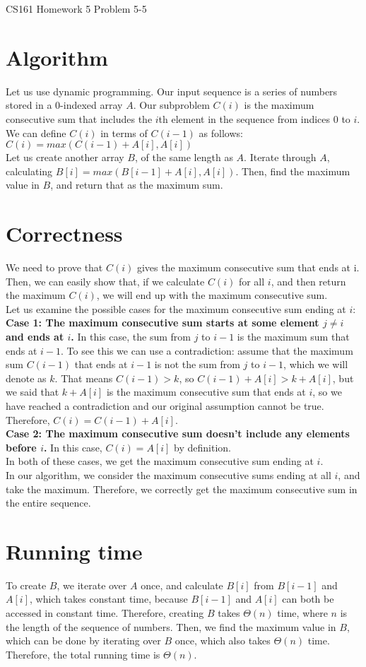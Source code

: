 \documentclass[12pt]{article}
\begin{document}
\begin{center}
{\Large CS161 Homework 5 Problem 5-5}

\end{center}
\section*{Algorithm}
Let us use dynamic programming. Our input sequence is a series of numbers stored in a 0-indexed array $A$. Our subproblem $C(i)$ is the maximum consecutive sum that includes the $i$th element in the sequence from indices $0$ to $i$. We can define $C(i)$ in terms of $C(i-1)$ as follows:\\
$C(i) = max(C(i-1) + A[i], A[i])$\\
Let us create another array $B$, of the same length as $A$. Iterate through $A$, calculating $B[i] = max(B[i-1] + A[i], A[i])$. Then, find the maximum value in $B$, and return that as the maximum sum. 

\section*{Correctness}
We need to prove that $C(i)$ gives the maximum consecutive sum that ends at i. Then, we can easily show that, if we calculate $C(i)$ for all $i$, and then return the maximum $C(i)$, we will end up with the maximum consecutive sum.\\
Let us examine the possible cases for the maximum consecutive sum ending at $i$:\\
\textbf{Case 1: The maximum consecutive sum starts at some element $j \ne i$ and ends at $i$.} In this case, the sum from $j$ to $i-1$ is the maximum sum that ends at $i-1$. To see this we can use a contradiction: assume that the maximum sum $C(i-1)$ that ends at $i-1$ is not the sum from $j$ to $i-1$, which we will denote as $k$. That means $C(i-1) > k$, so $C(i-1) + A[i] > k + A[i]$, but we said that $k + A[i]$ is the maximum consecutive sum that ends at $i$, so we have reached a contradiction and our original assumption cannot be true. Therefore, $C(i) = C(i-1) + A[i]$.\\
\textbf{Case 2: The maximum consecutive sum doesn't include any elements before $i$.} In this case, $C(i) = A[i]$ by definition.\\
In both of these cases, we get the maximum consecutive sum ending at $i$.\\
In our algorithm, we consider the maximum consecutive sums ending at all $i$, and take the maximum. Therefore, we correctly get the maximum consecutive sum in the entire sequence.

\section*{Running time}
To create $B$, we iterate over $A$ once, and calculate $B[i]$ from $B[i-1]$ and $A[i]$, which takes constant time, because $B[i-1]$ and $A[i]$ can both be accessed in constant time. Therefore, creating $B$ takes $\Theta(n)$ time, where $n$ is the length of the sequence of numbers. Then, we find the maximum value in $B$, which can be done by iterating over $B$ once, which also takes $\Theta(n)$ time. Therefore, the total running time is $\Theta(n)$.
\end{document}
